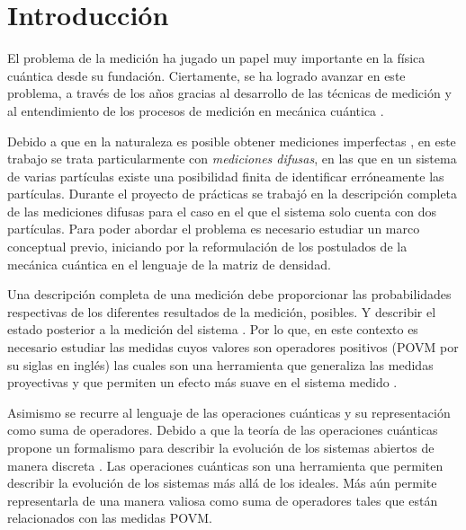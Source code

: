 \chapter*{Introducción}

El problema de la medición ha jugado un papel muy importante en la física
cuántica desde su fundación. Ciertamente, se ha logrado avanzar en este
problema, a través de los años gracias al desarrollo de las técnicas de
medición y al entendimiento de los procesos de medición en mecánica cuántica
{\cite{Pineda_2021}}. 

Debido a que en la naturaleza es posible obtener mediciones imperfectas , en
este trabajo se trata particularmente con \textit{mediciones difusas}, en las
que en un sistema de varias partículas existe una posibilidad finita de
identificar erróneamente las partículas. Durante el proyecto de prácticas se
trabajó en la descripción completa de las mediciones difusas para el caso en el
que el sistema solo cuenta con dos partículas. Para poder abordar el problema
es necesario estudiar un marco conceptual previo, iniciando por la
reformulación de los postulados de la mecánica cuántica en el lenguaje de la
matriz de densidad.

Una descripción completa de una medición debe proporcionar las probabilidades
respectivas de los diferentes resultados de la medición, posibles. Y describir
el estado posterior a la medición del sistema . Por lo que, en este contexto es
necesario estudiar las medidas cuyos valores son operadores positivos (POVM por
su siglas en inglés) las cuales son una herramienta que generaliza las medidas
proyectivas y que permiten un efecto más suave en el sistema medido .

Asimismo se recurre al lenguaje de las operaciones cuánticas y su
representación como  suma de operadores. Debido a que la teoría de las
operaciones cuánticas propone un formalismo para describir la evolución de los
sistemas abiertos de manera discreta {\cite{nielsen_chuang_2010}}. Las
operaciones cuánticas son una herramienta que permiten describir la evolución
de los sistemas más allá de los ideales. Más aún permite representarla de una
manera valiosa como suma de operadores tales que están relacionados con las
medidas POVM\@. 

